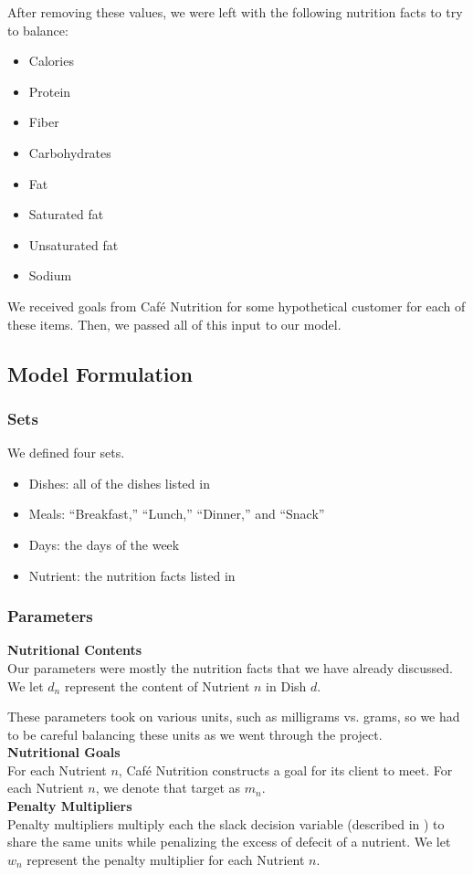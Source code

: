 \documentclass[twoside]{article}
\newcommand{\cn}{Caf\'e Nutrition\xspace}
\begin{document}
After removing these values, we were left with the following nutrition facts to try to balance:
\begin{itemize}
    \item Calories
    \item Protein
    \item Fiber
    \item Carbohydrates
    \item Fat
    \item Saturated fat
    \item Unsaturated fat
    \item Sodium
\end{itemize}

We received goals from \cn for some hypothetical customer for each of these items. Then, we passed all of this input to our model.
\subsection{Model Formulation}
\label{sec:model-formulation}
\subsubsection{Sets}
We defined four sets.
\begin{itemize}
    \item Dishes: all of the dishes listed in 
    \item Meals: ``Breakfast,'' ``Lunch,'' ``Dinner,'' and ``Snack''
    \item Days: the days of the week
    \item Nutrient: the nutrition facts listed in 
\end{itemize}

\subsubsection{Parameters}
\textbf{Nutritional Contents}\\[.1in]
\noindent
Our parameters were mostly the nutrition facts that we have already discussed. We let $d_n$ represent the content of Nutrient $n$ in Dish $d$.

These parameters took on various units, such as milligrams vs. grams, so we had to be careful balancing these units as we went through the project.\\[.1in]
\textbf{Nutritional Goals}\\[.1in]
\noindent For each Nutrient $n$, \cn constructs a goal for its client to meet. For each Nutrient $n$, we denote that target as $m_n$.\\[.1in]
\textbf{Penalty Multipliers}\\[.1in]
\noindent Penalty multipliers multiply each the slack decision variable (described in ) to share the same units while penalizing the excess of defecit of a nutrient. We let $w_n$ represent the penalty multiplier for each Nutrient $n$.
\end{document}
